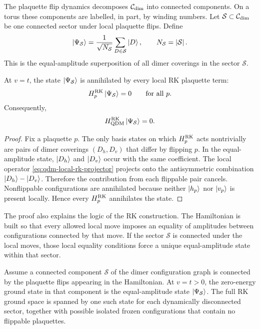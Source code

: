 The plaquette flip dynamics decomposes \(\mathcal{C}_{\rm dim}\) into connected
components.  On a torus these components are labelled, in part, by winding
numbers.  Let \(\mathcal{S}\subset\mathcal{C}_{\rm dim}\) be one connected
sector under local plaquette flips.  Define
\begin{equation}
\label{eq:rk-equal-amplitude-state}
    \left|\Psi_{\mathcal{S}}\right\rangle
    =
    \frac{1}{\sqrt{N_{\mathcal{S}}}}
    \sum_{D\in\mathcal{S}}\left|D\right\rangle,
    \qquad
    N_{\mathcal{S}}=\left|\mathcal{S}\right| .
\end{equation}
This is the equal-amplitude superposition of all dimer coverings in the sector
\(\mathcal{S}\).

\begin{proposition}
At \(v=t\), the state \(\left|\Psi_{\mathcal{S}}\right\rangle\) is annihilated by every local
RK plaquette term:
\begin{equation}
\label{eq:rk-state-annihilated}
    H_p^{\rm RK}\left|\Psi_{\mathcal{S}}\right\rangle=0
    \qquad
    \text{for all }p .
\end{equation}
Consequently,
\begin{equation}
\label{eq:rk-state-ground-energy}
    H_{\rm QDM}^{\rm RK}\left|\Psi_{\mathcal{S}}\right\rangle=0 .
\end{equation}
\end{proposition}

\begin{proof}
Fix a plaquette \(p\).  The only basis states on which
\(H_p^{\rm RK}\) acts nontrivially are pairs of dimer coverings
\((D_h,D_v)\) that differ by flipping \(p\).  In the equal-amplitude state,
\(\left|D_h\right\rangle\) and \(\left|D_v\right\rangle\) occur with the same coefficient.  The local
operator \cref{eq:qdm-local-rk-projector} projects onto the antisymmetric
combination \(\left|D_h\right\rangle-\left|D_v\right\rangle\).  Therefore the contribution from each
flippable pair cancels.  Nonflippable configurations are annihilated because
neither \(\left|h_p\right\rangle\) nor \(\left|v_p\right\rangle\) is present locally.  Hence every
\(H_p^{\rm RK}\) annihilates the state.
\end{proof}

The proof also explains the logic of the RK construction.  The Hamiltonian is
built so that every allowed local move imposes an equality of amplitudes between
configurations connected by that move.  If the sector \(\mathcal{S}\) is
connected under the local moves, those local equality conditions force a unique
equal-amplitude state within that sector.

\begin{theorem}
Assume a connected component \(\mathcal{S}\) of the dimer configuration graph is
connected by the plaquette flips appearing in the Hamiltonian.  At \(v=t>0\),
the zero-energy ground state in that component is the equal-amplitude state
\(\left|\Psi_{\mathcal{S}}\right\rangle\).  The full RK ground space is spanned by one such
state for each dynamically disconnected sector, together with possible isolated
frozen configurations that contain no flippable plaquettes.
\end{theorem}

